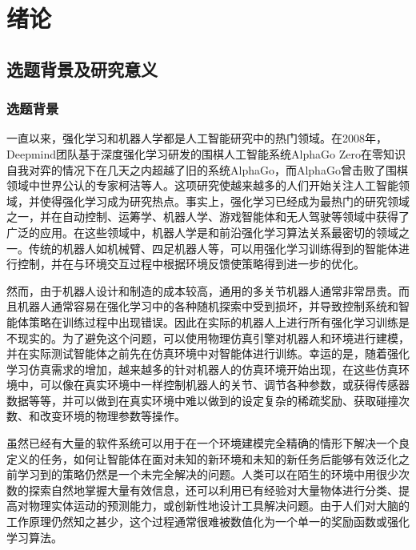 \chapter{绪论}

    \section{选题背景及研究意义}
    
        \subsection{选题背景}
        一直以来，强化学习和机器人学都是人工智能研究中的热门领域。在2008年，Deepmind团队基于深度强化学习研发的围棋人工智能系统AlphaGo Zero在零知识自我对弈的情况下在几天之内超越了旧的系统AlphaGo，而AlphaGo曾击败了围棋领域中世界公认的专家柯洁等人\cite{silver2018general}。这项研究使越来越多的人们开始关注人工智能领域，并使得强化学习成为研究热点。事实上，强化学习已经成为最热门的研究领域之一，并在自动控制、运筹学、机器人学、游戏智能体和无人驾驶等领域中获得了广泛的应用\cite{dosovitskiy2017carla}。在这些领域中，机器人学是和前沿强化学习算法关系最密切的领域之一。传统的机器人如机械臂、四足机器人等，可以用强化学习训练得到的智能体进行控制，并在与环境交互过程中根据环境反馈使策略得到进一步的优化。

        然而，由于机器人设计和制造的成本较高，通用的多关节机器人通常非常昂贵。而且机器人通常容易在强化学习中的各种随机探索中受到损坏，并导致控制系统和智能体策略在训练过程中出现错误。因此在实际的机器人上进行所有强化学习训练是不现实的\cite{toussaint2018differentiable, todorov2012mujoco}。为了避免这个问题，可以使用物理仿真引擎对机器人和环境进行建模，并在实际测试智能体之前先在仿真环境中对智能体进行训练。幸运的是，随着强化学习仿真需求的增加，越来越多的针对机器人的仿真环境开始出现，在这些仿真环境中，可以像在真实环境中一样控制机器人的关节、调节各种参数，或获得传感器数据等等，并可以做到在真实环境中难以做到的设定复杂的稀疏奖励、获取碰撞次数、和改变环境的物理参数等操作\cite{savva2019habitat}。

        虽然已经有大量的软件系统可以用于在一个环境建模完全精确的情形下解决一个良定义的任务\cite{toussaint2018differentiable}，如何让智能体在面对未知的新环境和未知的新任务后能够有效泛化之前学习到的策略仍然是一个未完全解决的问题。人类可以在陌生的环境中用很少次数的探索自然地掌握大量有效信息，还可以利用已有经验对大量物体进行分类、提高对物理实体运动的预测能力，或创新性地设计工具解决问题。由于人们对大脑的工作原理仍然知之甚少，这个过程通常很难被数值化为一个单一的奖励函数或强化学习算法。

